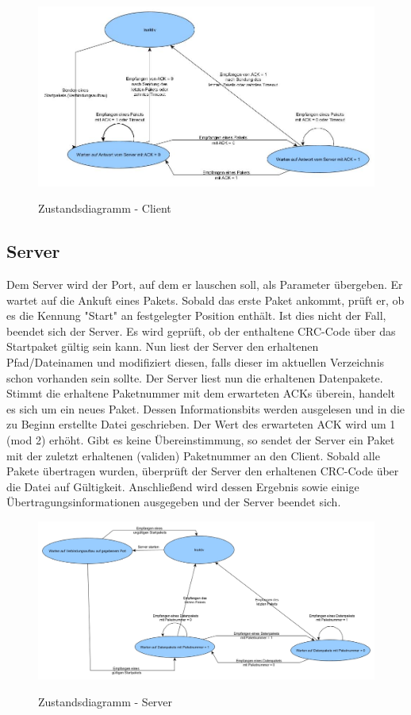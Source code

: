 \documentclass[a4paper,10pt]{article}
\begin{document}
	\begin{figure}[H]
		\caption{Zustandsdiagramm - Client}
		\includegraphics[width=\linewidth]{Zustandsdia_Client.jpg}
		\label{fig:Client}
	\end{figure}

	\subsection{Server}
	Dem Server wird der Port, auf dem er lauschen soll, als Parameter übergeben. Er wartet auf die Ankuft eines Pakets. Sobald das erste Paket ankommt, prüft er, ob es die Kennung "Start" an festgelegter Position enthält. Ist dies nicht der Fall, beendet sich der Server. Es wird geprüft, ob der enthaltene CRC-Code über das Startpaket gültig sein kann.	Nun liest der Server den erhaltenen Pfad/Dateinamen und modifiziert diesen, falls dieser im aktuellen Verzeichnis schon vorhanden sein sollte.
	Der Server liest nun die erhaltenen Datenpakete. Stimmt die erhaltene Paketnummer mit dem erwarteten ACKs überein, handelt es sich um ein neues Paket. Dessen Informationsbits werden ausgelesen und in die zu Beginn erstellte Datei geschrieben. Der Wert des erwarteten ACK wird um 1 (mod 2) erhöht. Gibt es keine Übereinstimmung, so sendet der Server ein Paket mit der zuletzt erhaltenen (validen) Paketnummer an den Client. Sobald alle Pakete übertragen wurden, überprüft der Server den erhaltenen CRC-Code über die Datei auf Gültigkeit. Anschließend wird dessen Ergebnis sowie einige Übertragungsinformationen ausgegeben und der Server beendet sich.
	


	\begin{figure}[H]
		\caption{Zustandsdiagramm - Server}
		\centering
		\includegraphics[width=\linewidth]{Zustandsdia_Server.jpg}
		\label{fig:Server}
	\end{figure}
\end{document}
